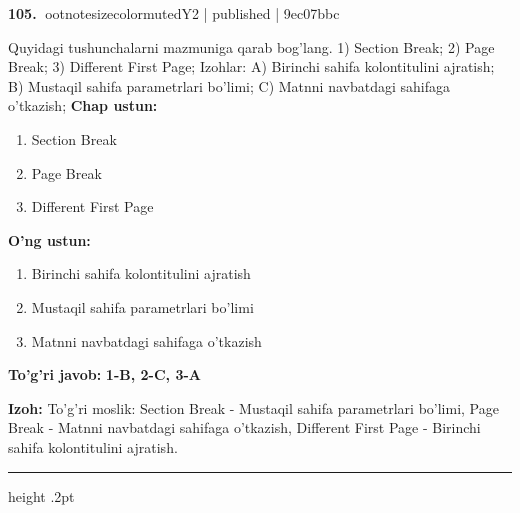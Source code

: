 \documentclass[10pt,a4paper]{article}
\begin{document}
\textbf{\color{ink}105.} {ootnotesizecolor{muted}Y2 | published | 9ec07bbc}
\par
Quyidagi tushunchalarni mazmuniga qarab bog'lang.  1) Section Break;  2) Page Break;  3) Different First Page;  Izohlar: A) Birinchi sahifa kolontitulini ajratish;  B) Mustaqil sahifa parametrlari bo'limi;  C) Matnni navbatdagi sahifaga o'tkazish;
\textbf{Chap ustun:}\begin{enumerate}[label=\arabic*),leftmargin=9mm]
\item Section Break
\item Page Break
\item Different First Page
\end{enumerate}
\textbf{O'ng ustun:}\begin{enumerate}[label=\Alph*),leftmargin=9mm]
\item Birinchi sahifa kolontitulini ajratish
\item Mustaqil sahifa parametrlari bo'limi
\item Matnni navbatdagi sahifaga o'tkazish
\end{enumerate}
\begin{tcolorbox}[enhanced,breakable,colback=teal!4,colframe=teal!55!black,boxrule=0.45pt,arc=1.2mm,left=2.8mm,right=2.8mm,top=2mm,bottom=2mm]
\textbf{\color{teal}To'g'ri javob:} \textbf{1-B, 2-C, 3-A}
\par\smallskip
\textbf{Izoh:} To'g'ri moslik: Section Break - Mustaqil sahifa parametrlari bo'limi, Page Break - Matnni navbatdagi sahifaga o'tkazish, Different First Page - Birinchi sahifa kolontitulini ajratish.
\end{tcolorbox}
\vspace{2mm}\hrule height .2pt\vspace{2mm}
\end{document}
